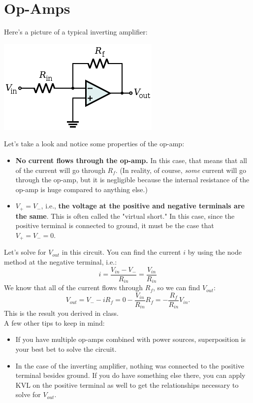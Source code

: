 \documentclass[11pt]{article}
\begin{document}
\section*{Op-Amps}
Here's a picture of a typical inverting amplifier:
\begin{center}
\includegraphics[scale=0.7]{opamp.png}
\end{center}
Let's take a look and notice some properties of the op-amp:
\begin{itemize}
\item {\bf No current flows through the op-amp.} In this case, that means that all of the current will go through $R_f$. (In reality, of course, {\em some} current will go through the op-amp, but it is negligible because the internal resistance of the op-amp is huge compared to anything else.)
\item $\boxed{V_+ = V_-}$, i.e., {\bf the voltage at the positive and negative terminals are the same}. This is often called the "virtual short." In this case, since the positive terminal is connected to ground, it must be the case that $V_+ = V_- = 0$.
\end{itemize}
Let's solve for $V_{out}$ in this circuit. You can find the current $i$ by using the node method at the negative terminal, i.e.:
\[i = \frac{V_{in} - V_-}{R_{in}} = \frac{V_{in}}{R_{in}} \]
We know that all of the current flows through $R_f$, so we can find $V_{out}$:
\[ V_{out} = V_- - iR_f = 0 - \frac{V_{in}}{R_{in}} R_f = \boxed{- \frac{R_f }{R_{in}} V_{in}.}\]
This is the result you derived in class.\\

\noindent A few other tips to keep in mind:
\begin{itemize}
\item If you have multiple op-amps combined with power sources, superposition is your best bet to solve the circuit.
\item In the case of the inverting amplifier, nothing was connected to the positive terminal besides ground. If you do have something else there, you can apply KVL on the positive terminal as well to get the relationships necessary to solve for $V_{out}$.
\end{itemize}
\end{document}
